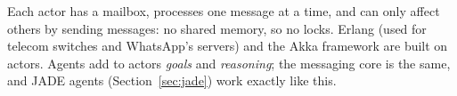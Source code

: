 \begin{nbintuition}
Each actor has a mailbox, processes one message at a time, and can only affect others by
sending messages: no shared memory, so no locks. Erlang (used for telecom switches and
WhatsApp's servers) and the Akka framework are built on actors. Agents add to actors
\emph{goals} and \emph{reasoning}; the messaging core is the same, and JADE agents
(Section~\ref{sec:jade}) work exactly like this.
\end{nbintuition}
